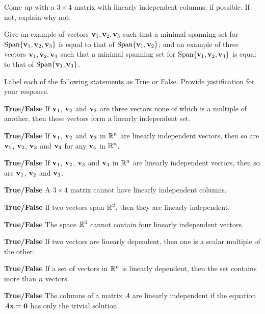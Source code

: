 \item Come up with a $3\times 4$ matrix with linearly independent columns, if possible. If not, explain why not.

\item Give an example of vectors $\mathbf{v}_1, \mathbf{v}_2, \mathbf{v}_3$ such that a minimal spanning set for $\text{Span}\{\mathbf{v}_1, \mathbf{v}_2, \mathbf{v}_3\}$ is equal to that of $\text{Span}\{\mathbf{v}_1, \mathbf{v}_2\}$; and an example of three vectors $\mathbf{v}_1, \mathbf{v}_2, \mathbf{v}_3$ such that a minimal spanning set for $\text{Span}\{\mathbf{v}_1, \mathbf{v}_2, \mathbf{v}_3\}$ is equal to that of $\text{Span}\{\mathbf{v}_1, \mathbf{v}_3\}$.

\item Label each of the following statements as True or False. Provide justification for your response.
\ba
\item \textbf{True/False} If $\mathbf{v}_1$, $\mathbf{v}_2$ and $\mathbf{v}_3$ are three vectors none of which is a multiple of another, then these vectors form a linearly independent set.

\item \textbf{True/False} If $\mathbf{v}_1$, $\mathbf{v}_2$ and $\mathbf{v}_3$ in $\mathbb{R}^n$ are linearly independent vectors, then so are $\mathbf{v}_1$, $\mathbf{v}_2$, $\mathbf{v}_3$ and $\mathbf{v}_4$ for any $\mathbf{v}_4$ in $\mathbb{R}^n$.

\item \textbf{True/False} If $\mathbf{v}_1$, $\mathbf{v}_2$, $\mathbf{v}_3$ and $\mathbf{v}_4$ in $\mathbb{R}^n$ are linearly independent vectors, then so are $\mathbf{v}_1$, $\mathbf{v}_2$ and $\mathbf{v}_3$.

\item \textbf{True/False} A $3\times 4$ matrix cannot have linearly independent columns.

\item \textbf{True/False} If two vectors span $\mathbb{R}^2$, then they are linearly independent.

\item \textbf{True/False} The space $\mathbb{R}^3$ cannot contain four linearly independent vectors.

\item \textbf{True/False} If two vectors are linearly dependent, then one is a scalar multiple of the other.

\item \textbf{True/False} If a set of vectors in $\mathbb{R}^n$ is linearly dependent, then the set contains more than $n$ vectors.

\item \textbf{True/False} The columns of a matrix $A$ are linearly independent if the equation $A\mathbf{x}=\mathbf{0}$ has only the trivial solution.

